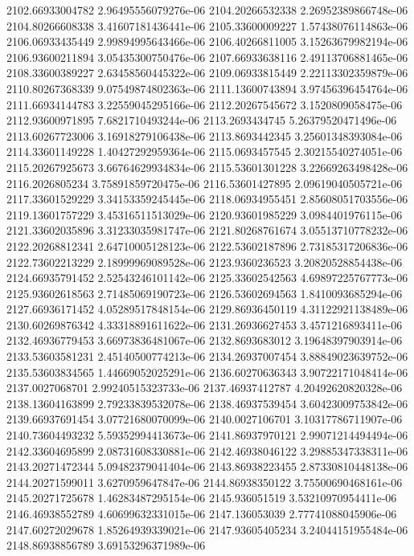 {2102.66933004782 2.96495556079276e-06
2104.20266532338 2.26952389866748e-06
2104.80266608338 3.41607181436441e-06
2105.33600009227 1.57438076114863e-06
2106.06933435449 2.99894995643466e-06
2106.40266811005 3.15263679982194e-06
2106.93600211894 3.05435300750476e-06
2107.66933638116 2.49113706881465e-06
2108.33600389227 2.63458560445322e-06
2109.06933815449 2.22113302359879e-06
2110.80267368339 9.07549874802363e-06
2111.13600743894 3.97456396454764e-06
2111.66934144783 3.22559045295166e-06
2112.20267545672 3.1520809058475e-06
2112.93600971895 7.6821710493244e-06
2113.2693434745 5.26379520471496e-06
2113.60267723006 3.16918279106438e-06
2113.8693442345 3.25601348393084e-06
2114.33601149228 1.40427292959364e-06
2115.0693457545 2.30215540274051e-06
2115.20267925673 3.66764629934834e-06
2115.53601301228 3.22669263498428e-06
2116.2026805234 3.75891859720475e-06
2116.53601427895 2.09619040505721e-06
2117.33601529229 3.34153359245445e-06
2118.06934955451 2.85608051703556e-06
2119.13601757229 3.45316511513029e-06
2120.93601985229 3.0984401976115e-06
2121.33602035896 3.31233035981747e-06
2121.80268761674 3.05513710778232e-06
2122.20268812341 2.64710005128123e-06
2122.53602187896 2.73185317206836e-06
2122.73602213229 2.18999969089528e-06
2123.9360236523 3.20820528854438e-06
2124.66935791452 2.52543246101142e-06
2125.33602542563 4.69897225767773e-06
2125.93602618563 2.71485069190723e-06
2126.53602694563 1.8410093685294e-06
2127.66936171452 4.05289517848154e-06
2129.86936450119 4.31122921138489e-06
2130.60269876342 4.33318891611622e-06
2131.26936627453 3.4571216893411e-06
2132.46936779453 3.66973836481067e-06
2132.8693683012 3.19648397903914e-06
2133.53603581231 2.45140500774213e-06
2134.26937007454 3.88849023639752e-06
2135.53603834565 1.44669052025291e-06
2136.60270636343 3.90722171048414e-06
2137.0027068701 2.99240515323733e-06
2137.46937412787 4.20492620820328e-06
2138.13604163899 2.79233839532078e-06
2138.46937539454 3.60423009753842e-06
2139.66937691454 3.07721680070099e-06
2140.0027106701 3.10317786711907e-06
2140.73604493232 5.59352994413673e-06
2141.86937970121 2.99071214494494e-06
2142.33604695899 2.08731608330881e-06
2142.46938046122 3.29885347338311e-06
2143.20271472344 5.09482379041404e-06
2143.86938223455 2.87330810448138e-06
2144.20271599011 3.6270959647847e-06
2144.86938350122 3.75500690468161e-06
2145.20271725678 1.46283487295154e-06
2145.936051519 3.53210970954411e-06
2146.46938552789 4.60699632331015e-06
2147.136053039 2.77741088045906e-06
2147.60272029678 1.85264939339021e-06
2147.93605405234 3.24044151955484e-06
2148.86938856789 3.69153296371989e-06
}
